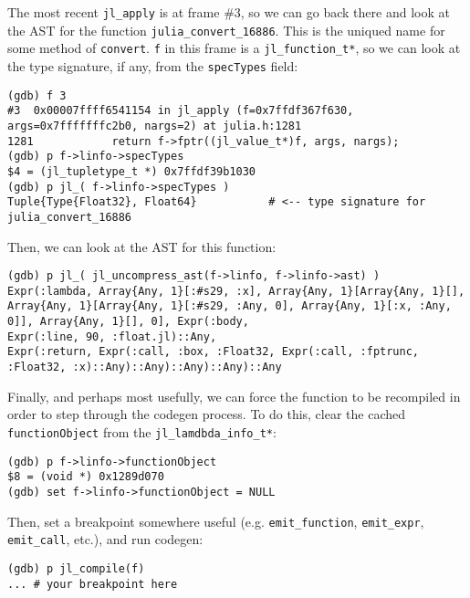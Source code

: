 The most recent \texttt{jl\_apply} is at frame \#3, so we can go back there and look at the AST for the function \texttt{julia\_convert\_16886}. This is the uniqued name for some method of \texttt{convert}. \texttt{f} in this frame is a \texttt{jl\_function\_t*}, so we can look at the type signature, if any, from the \texttt{specTypes} field:




\begin{lstlisting}
(gdb) f 3
#3  0x00007ffff6541154 in jl_apply (f=0x7ffdf367f630, args=0x7fffffffc2b0, nargs=2) at julia.h:1281
1281            return f->fptr((jl_value_t*)f, args, nargs);
(gdb) p f->linfo->specTypes
$4 = (jl_tupletype_t *) 0x7ffdf39b1030
(gdb) p jl_( f->linfo->specTypes )
Tuple{Type{Float32}, Float64}           # <-- type signature for julia_convert_16886
\end{lstlisting}



Then, we can look at the AST for this function:




\begin{lstlisting}
(gdb) p jl_( jl_uncompress_ast(f->linfo, f->linfo->ast) )
Expr(:lambda, Array{Any, 1}[:#s29, :x], Array{Any, 1}[Array{Any, 1}[], Array{Any, 1}[Array{Any, 1}[:#s29, :Any, 0], Array{Any, 1}[:x, :Any, 0]], Array{Any, 1}[], 0], Expr(:body,
Expr(:line, 90, :float.jl)::Any,
Expr(:return, Expr(:call, :box, :Float32, Expr(:call, :fptrunc, :Float32, :x)::Any)::Any)::Any)::Any)::Any
\end{lstlisting}



Finally, and perhaps most usefully, we can force the function to be recompiled in order to step through the codegen process. To do this, clear the cached \texttt{functionObject} from the \texttt{jl\_lamdbda\_info\_t*}:




\begin{lstlisting}
(gdb) p f->linfo->functionObject
$8 = (void *) 0x1289d070
(gdb) set f->linfo->functionObject = NULL
\end{lstlisting}



Then, set a breakpoint somewhere useful (e.g. \texttt{emit\_function}, \texttt{emit\_expr}, \texttt{emit\_call}, etc.), and run codegen:




\begin{lstlisting}
(gdb) p jl_compile(f)
... # your breakpoint here
\end{lstlisting}



